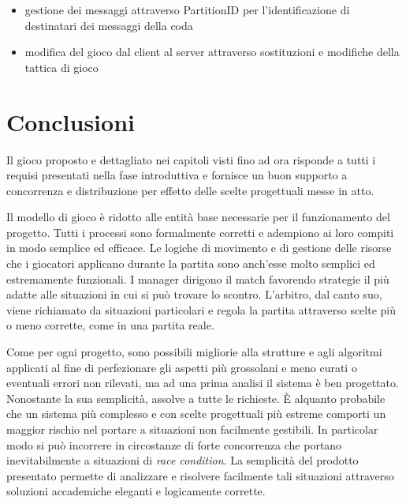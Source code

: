 \documentclass[aps,letterpaper,10pt]{article}
\begin{document}

\newpage

\begin{itemize}

\item gestione dei messaggi attraverso PartitionID per l'identificazione di destinatari dei messaggi della coda

\item modifica del gioco dal client al server attraverso sostituzioni e modifiche della tattica di gioco

\end{itemize}

\newpage

\section{Conclusioni}

Il gioco proposto e dettagliato nei capitoli visti fino ad ora risponde a tutti i requisi presentati nella fase
introduttiva e fornisce un buon supporto a concorrenza e distribuzione per effetto delle scelte progettuali messe in
atto. \vspace{3mm}

Il modello di gioco \`e ridotto alle entit\`a base necessarie per il funzionamento del progetto. Tutti i processi sono
formalmente corretti e adempiono ai loro compiti in modo semplice ed efficace. Le logiche di movimento e di gestione
delle risorse che i giocatori applicano durante la partita sono anch'esse molto semplici ed estremamente funzionali. I
manager dirigono il match favorendo strategie il pi\`u adatte alle situazioni in cui si pu\`o trovare lo scontro.
L'arbitro, dal canto suo, viene richiamato da situazioni particolari e regola la partita attraverso scelte pi\`u o meno
corrette, come in una partita reale. \vspace{3mm}

Come per ogni progetto, sono possibili migliorie alla strutture e agli algoritmi applicati al fine di perfezionare gli
aspetti pi\`u grossolani e meno curati o eventuali errori non rilevati, ma ad una prima analisi il sistema \`e ben
progettato. Nonostante la sua semplicit\`a, assolve a tutte le richieste. \`E alquanto probabile che un sistema pi\`u
complesso e con scelte progettuali pi\`u estreme comporti un maggior rischio nel portare a situazioni non facilmente
gestibili. In particolar modo si pu\`o incorrere in circostanze di forte concorrenza che portano inevitabilmente a
situazioni di \emph{race condition}. La semplicit\`a del prodotto presentato permette di analizzare e risolvere
facilmente tali situazioni attraverso soluzioni accademiche eleganti e logicamente corrette. \vspace{3mm}
\end{document}

